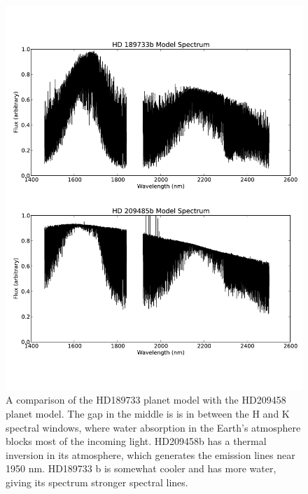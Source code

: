 \begin{figure}[t]
  \centering
  \includegraphics[width=5.5in]{Figures/paper2_fig3.pdf}
  \caption{A comparison of the HD189733 planet model with the HD209458
  planet model. The gap in the middle is is in between the H and K
  spectral windows, where water absorption in the Earth's atmosphere
  blocks most of the incoming light. HD209458b has a thermal inversion
  in its atmosphere, which generates the emission lines near 1950
  nm. HD189733 b is somewhat cooler and has more water, giving its
  spectrum stronger spectral lines.}
  \label{paper2_fig:modelcomp}
\end{figure}


